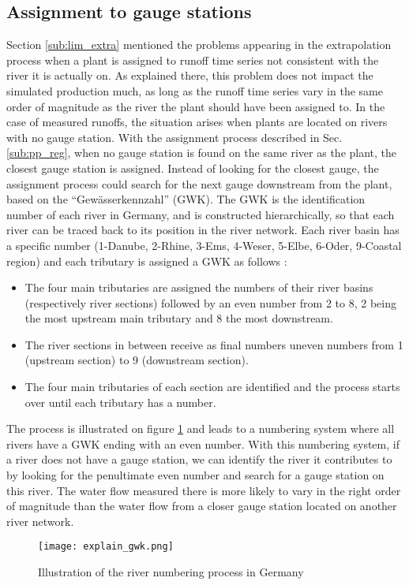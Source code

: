 \subsection{Assignment to gauge stations}
\label{sub:imp_assign_gauge}
Section \ref{sub:lim_extra} mentioned the problems appearing in the extrapolation process when a plant is assigned to runoff time series not consistent with the river it is actually on. As explained there, this problem does not impact the simulated production much, as long as the runoff time series vary in the same order of magnitude as the river the plant should have been assigned to. In the case of measured runoffs, the situation arises when plants are located on rivers with no gauge station. With the assignment process described in Sec. \ref{sub:pp_reg}, when no gauge station is found on the same river as the plant, the closest gauge station is assigned. \newline
Instead of looking for the closest gauge, the assignment process could search for the next gauge downstream from the plant, based on the ``Gewässerkennzahl'' (GWK). The GWK is the identification number of each river in Germany, and is constructed hierarchically, so that each river can be traced back to its position in the river network. Each river basin has a specific number (1-Danube, 2-Rhine, 3-Ems, 4-Weser, 5-Elbe, 6-Oder, 9-Coastal region) and each tributary is assigned a GWK as follows :
\begin{itemize}
 \item The four main tributaries are assigned the numbers of their river basins (respectively river sections) followed by an even number from 2 to 8, 2 being the most upstream main tributary and 8 the most downstream.
 \item The river sections in between receive as final numbers uneven numbers from 1 (upstream section) to 9 (downstream section).
 \item The four main tributaries of each section are identified and the process starts over until each tributary has a number.
\end{itemize}
The process is illustrated on figure \ref{explain_gwk} and leads to a numbering system where all rivers have a GWK ending with an even number. With this numbering system, if a river does not have a gauge station, we can identify the river it contributes to by looking for the penultimate even number and search for a gauge station on this river. The water flow measured there is more likely to vary in the right order of magnitude than the water flow from a closer gauge station located on another river network.
\begin{figure}[H]
\centering
\texttt{[image: explain\_gwk.png]}
\caption{Illustration of the river numbering process in Germany}
\label{explain_gwk}
\end{figure}


